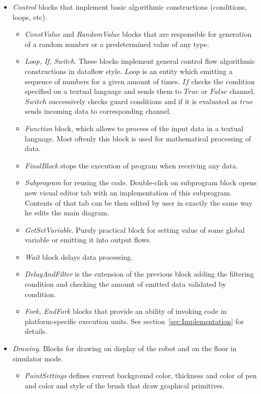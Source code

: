 \documentclass[conference,compsoc]{IEEEtran}
\begin{document}
\begin{itemize}
\item \textit{Control} blocks that implement basic algorithmic constructions (conditions, loops, etc).
\begin{itemize}
\item \textit{ConstValue} and \textit{RandomValue} blocks that are responsible for generation of a random number or a predetermined value of any type.
\item \textit{Loop, If, Switch}. These blocks implement general control flow algorithmic constructions in dataflow style. $Loop$ is an entity which emitting a sequence of numbers for a given amount of times. $If$ checks the condition specified on a textual language and sends them to $True$ or $False$ channel. $Switch$ successively checks guard conditions and if it is evaluated as $true$ sends incoming data to corresponding channel.  	
\item \textit{Function} block, which allows to process of the input data in a textual language. Most oftenly this block is used for mathematical processing of data.
\item \textit{FinalBlock} stops the execution of program when receiving any data. 
\item \textit{Subprogram} for reusing the code. Double-click on subprogram block opens new visual editor tab with an implementation of this subprogram. Contents of that tab can be then edited by user in exactly the same way he edits the main diagram.
\item \textit{GetSetVariable}. Purely practical block for setting value of some global variable or emitting it into output flows.
\item \textit{Wait} block delays data processing.
\item \textit{DelayAndFilter} is the extension of the previous block adding the filtering condition and checking the amount of emitted data validated by condition.
\item \textit{Fork, EndFork} blocks that provide an ability of invoking code in platform-specific execution units. See section~\ref{sec:Implementation} for details.
\end{itemize} 
\item \textit{Drawing}. Blocks for drawing on display of the robot and on the floor in simulator mode.
\begin{itemize}
\item \textit{PaintSettings} defines current background color, thickness and color of pen and color and style of the brush that draw graphical primitives.

\end{itemize}
\end{itemize}
\end{document}

